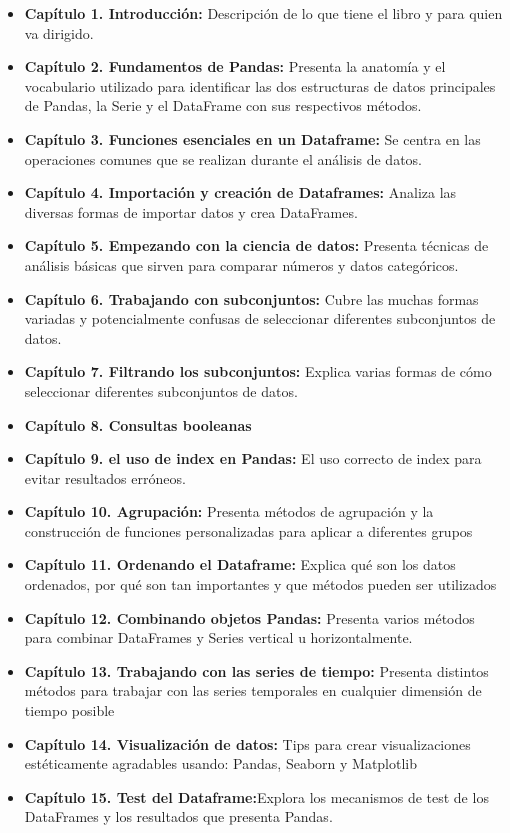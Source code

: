 \documentclass[
]{book}
\begin{document}
\begin{itemize}
\item
  \textbf{Capítulo 1. Introducción:} Descripción de lo que tiene el libro y para quien va dirigido.
\item
  \textbf{Capítulo 2. Fundamentos de Pandas:} Presenta la anatomía y el vocabulario utilizado para identificar las dos estructuras de datos principales de Pandas, la Serie y el DataFrame con sus respectivos métodos.
\item
  \textbf{Capítulo 3. Funciones esenciales en un Dataframe:} Se centra en las operaciones comunes que se realizan durante el análisis de datos.
\item
  \textbf{Capítulo 4. Importación y creación de Dataframes:} Analiza las diversas formas de importar datos y crea DataFrames.
\item
  \textbf{Capítulo 5. Empezando con la ciencia de datos:} Presenta técnicas de análisis básicas que sirven para comparar números y datos categóricos.
\item
  \textbf{Capítulo 6. Trabajando con subconjuntos:} Cubre las muchas formas variadas y potencialmente confusas de seleccionar diferentes subconjuntos de datos.
\item
  \textbf{Capítulo 7. Filtrando los subconjuntos:} Explica varias formas de cómo seleccionar diferentes subconjuntos de datos.
\item
  \textbf{Capítulo 8. Consultas booleanas}
\item
  \textbf{Capítulo 9. el uso de index en Pandas:} El uso correcto de index para evitar resultados erróneos.
\item
  \textbf{Capítulo 10. Agrupación:} Presenta métodos de agrupación y la construcción de funciones personalizadas para aplicar a diferentes grupos
\item
  \textbf{Capítulo 11. Ordenando el Dataframe:} Explica qué son los datos ordenados, por qué son tan importantes y que métodos pueden ser utilizados
\item
  \textbf{Capítulo 12. Combinando objetos Pandas:} Presenta varios métodos para combinar DataFrames y Series vertical u horizontalmente.
\item
  \textbf{Capítulo 13. Trabajando con las series de tiempo:} Presenta distintos métodos para trabajar con las series temporales en cualquier dimensión de tiempo posible
\item
  \textbf{Capítulo 14. Visualización de datos:} Tips para crear visualizaciones estéticamente agradables usando: Pandas, Seaborn y Matplotlib
\item
  \textbf{Capítulo 15. Test del Dataframe:}Explora los mecanismos de test de los DataFrames y los resultados que presenta Pandas.
\end{itemize}
\end{document}

